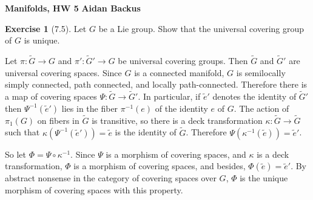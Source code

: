 \documentclass[10pt]{article}
\theoremstyle{definition}
\newtheorem{exer}{Exercise}
\begin{document}
\noindent
\large\textbf{Manifolds, HW 5} \hfill \textbf{Aidan Backus} \\


\begin{exer}[7.5]
Let $G$ be a Lie group. Show that the universal covering group of $G$ is unique.
\end{exer}

Let $\pi: \widetilde G \to G$ and $\pi': \widetilde G' \to G$ be universal covering groups.
Then $\widetilde G$ and $\widetilde G'$ are universal covering spaces.
Since $G$ is a connected manifold, $G$ is semilocally simply connected, path connected, and locally path-connected.
Therefore there is a map of covering spaces $\Psi: \widetilde G \to \widetilde G'$.
In particular, if $\tilde e'$ denotes the identity of $\widetilde G'$ then $\Psi^{-1}(\tilde e')$ lies in the fiber $\pi^{-1}(e)$ of the identity $e$ of $G$.
The action of $\pi_1(G)$ on fibers in $\widetilde G$ is transitive, so there is a deck transformation $\kappa: \widetilde G \to \widetilde G$ such that $\kappa(\Psi^{-1}(\tilde e')) = \tilde e$ is the identity of $\widetilde G$. Therefore $\Psi(\kappa^{-1}(\tilde e)) = \tilde e'$.

So let $\Phi = \Psi \circ \kappa^{-1}$. Since $\Psi$ is a morphism of covering spaces, and $\kappa$ is a deck transformation, $\Phi$ is a morphism of covering spaces, and besides, $\Phi(\tilde e) = \tilde e'$.
By abstract nonsense in the category of covering spaces over $G$, $\Phi$ is the unique morphism of covering spaces with this property.
\end{document}
